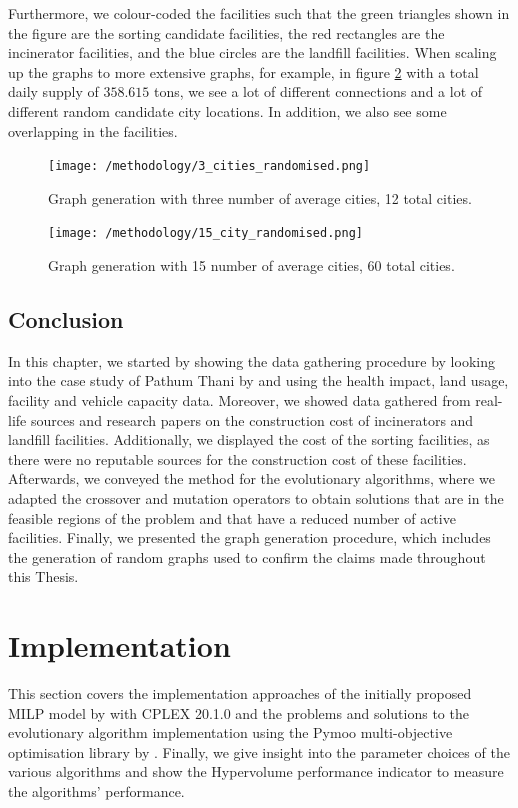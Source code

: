 \documentclass[mscthesis, 11pt]{usiinfthesis}
\theoremstyle{newdefinition}
\begin{document}
Furthermore, we colour-coded the facilities such that the green triangles shown in the figure are the sorting candidate facilities, the red rectangles are the incinerator facilities, and the blue circles are the landfill facilities. When scaling up the graphs to more extensive graphs, for example, in figure \ref{fig:15_city_graph} with a total daily supply of $358.615$ tons, we see a lot of different connections and a lot of different random candidate city locations. In addition, we also see some overlapping in the facilities.
\begin{figure}[ht]
    \centering
    \texttt{[image: /methodology/3\_cities\_randomised.png]}
    \caption{Graph generation with three number of average cities, 12 total cities.}
    \label{fig:3_city_graph}
\end{figure}
\begin{figure}[ht]
    \centering
    \texttt{[image: /methodology/15\_city\_randomised.png]}
    \caption{Graph generation with 15 number of average cities, 60 total cities.}
    \label{fig:15_city_graph}
\end{figure}
\clearpage
\section{Conclusion}
In this chapter, we started by showing the data gathering procedure by looking into the case study of Pathum Thani by \cite{olapiriyakul_multiobjective_2019} and using the health impact, land usage, facility and vehicle capacity data. Moreover, we showed data gathered from real-life sources and research papers on the construction cost of incinerators and landfill facilities. Additionally, we displayed the cost of the sorting facilities, as there were no reputable sources for the construction cost of these facilities. 
Afterwards, we conveyed the method for the evolutionary algorithms, where we adapted the crossover and mutation operators to obtain solutions that are in the feasible regions of the problem and that have a reduced number of active facilities. Finally, we presented the graph generation procedure, which includes the generation of random graphs used to confirm the claims made throughout this Thesis.

\chapter[Implementation]{Implementation}\label{chapter:implementation}
This section covers the implementation approaches of the initially proposed MILP model by \cite{olapiriyakul_multiobjective_2019} with CPLEX 20.1.0 and the problems and solutions to the evolutionary algorithm implementation using the Pymoo multi-objective optimisation library by \cite{blank_pymoo_2020}. Finally, we give insight into the parameter choices of the various algorithms and show the Hypervolume performance indicator to measure the algorithms' performance.
\end{document}
